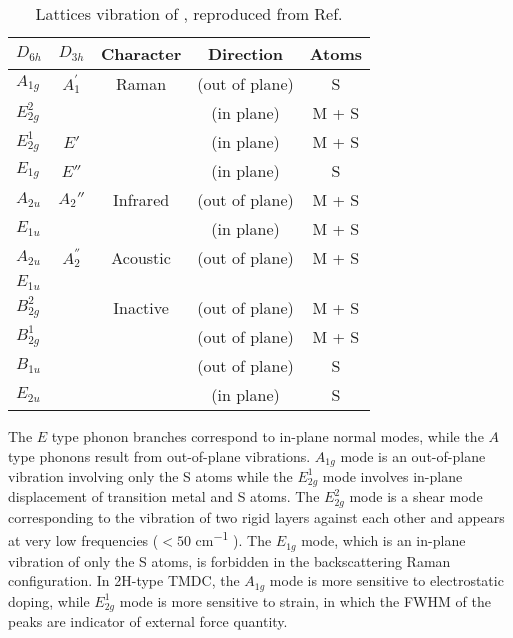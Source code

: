 \begin{table}[htb]
\centering
\caption[Lattices vibration modes of ]{Lattices vibration of , reproduced from Ref.\cite{Molina-Sanchez2011}}\label{tab:tmslattice}
\begin{tabular}{lcccc}
\toprule
 $D_{6h}$   & $D_{3h}$ & Character &  Direction & Atoms  \\
\midrule
$A_{1g}$    &  $A_1^{'}$   & Raman     & (out of plane)  & S  \\
$E_{2g}^2$  &          &           & (in plane)      & M + S  \\
$E_{2g}^1$  &  $E'$    &           & (in plane)      & M + S  \\
$E_{1g}$    &  $E''$    &           & (in plane)      & S  \\
\midrule
$A_{2u}$    &  $A_2''$  & Infrared  & (out of plane)  & M + S  \\
$E_{1u}$    &          &           & (in plane)      & M + S  \\
\midrule
$A_{2u}$    &  $A_2^{''}$   & Acoustic  & (out of plane)  & M + S  \\
$E_{1u}$    &          &           &       &    \\
\midrule
$B_{2g}^2$  &          & Inactive  & (out of plane)  & M + S  \\
$B_{2g}^1$  &          &           & (out of plane)  & M + S  \\
$B_{1u}$    &          &           & (out of plane)  & S  \\
$E_{2u}$    &          &           & (in plane)      & S  \\
\bottomrule
\end{tabular}
\end{table}
The $E$ type phonon branches correspond to in-plane normal modes, while the $A$ type phonons result from out-of-plane vibrations. $A_{1g}$ mode is an out-of-plane vibration involving only the S atoms while the $E_{2g}^1$ mode involves in-plane displacement of transition metal and S atoms. The $E_{2g}^2$ mode is a shear mode corresponding to the vibration of two rigid layers against
each other and appears at very low frequencies ($<50$ \si{cm^{-1}} \cite{Zhang2013e}). The $E_{1g}$ mode, which is an in-plane vibration of only the S atoms, is forbidden in the backscattering Raman configuration. In 2H-type TMDC, the $A_{1g}$ mode is more sensitive to electrostatic doping, while $E_{2g}^1$ mode is more sensitive to strain, in which the FWHM of the peaks are indicator of external force quantity.\cite{Zhao2013}

